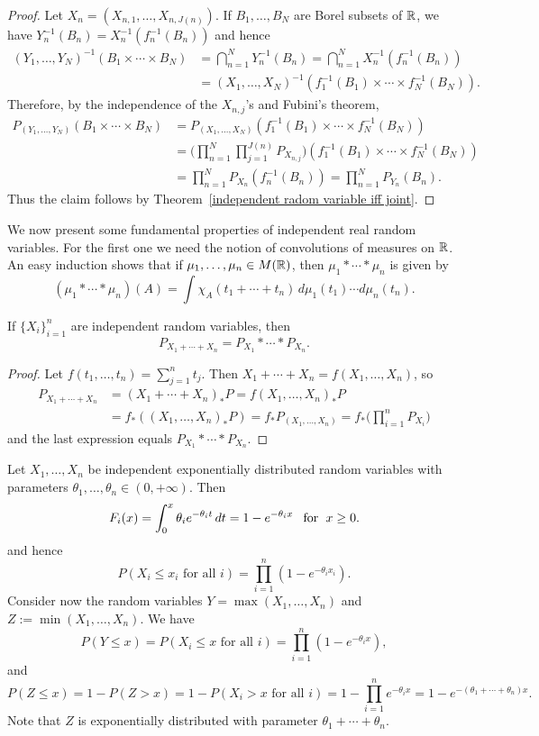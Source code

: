 \begin{proof}
Let $X_n=(X_{n,1},\dots,X_{n,J(n)})$. If $B_1,\dots,B_N$ are Borel subsets of $\mathbb{R}$, we have $Y_n^{-1}(B_n)=X_n^{-1}(f_n^{-1}(B_n))$ and hence
\begin{align*}
(Y_1,\dots,Y_N)^{-1}(B_1\times\cdots\times B_N)&=\bigcap_{n=1}^{N}Y_n^{-1}(B_n)=\bigcap_{n=1}^{N}X_n^{-1}(f_n^{-1}(B_n))\\
&=(X_1,\dots,X_N)^{-1}(f_1^{-1}(B_1)\times\cdots\times f_N^{-1}(B_N)).
\end{align*}
Therefore, by the independence of the $X_{n,j}$'s and Fubini's theorem,
\begin{align*}
P_{(Y_1,\dots,Y_N)}(B_1\times\cdots\times B_N)&=P_{(X_1,\dots,X_N)}(f_1^{-1}(B_1)\times\cdots\times f_N^{-1}(B_N))\\
&=\Big(\prod_{n=1}^{N}\prod_{j=1}^{J(n)}P_{X_{n,j}}\Big)(f_1^{-1}(B_1)\times\cdots\times f_N^{-1}(B_N))\\
&=\prod_{n=1}^{N}P_{X_n}(f_n^{-1}(B_n))=\prod_{n=1}^{N}P_{Y_n}(B_n).
\end{align*}
Thus the claim follows by Theorem~\ref{independent radom variable iff joint}.
\end{proof}
We now present some fundamental properties of independent real random variables. For the first one we need the notion of convolutions of measures on $\mathbb{R}$. An easy induction shows that if $\mu_1,\dots,\mu_n\in M(\mathbb{R})$, then $\mu_1\ast\cdots\ast\mu_n$ is given by
\[(\mu_1\ast\cdots\ast\mu_n)(A)=\int\chi_A(t_1+\cdots+t_n)\,d\mu_1(t_1)\cdots d\mu_n(t_n).\]
\begin{proposition}
If $\{X_i\}_{i=1}^{n}$ are independent random variables, then
\[P_{X_1+\cdots+X_n}=P_{X_1}\ast\cdots\ast P_{X_n}.\]
\end{proposition}
\begin{proof}
Let $f(t_1,\dots,t_n)=\sum_{j=1}^{n}t_j$. Then $X_1+\cdots+X_n=f(X_1,\dots,X_n)$, so
\begin{align*}
P_{X_1+\cdots+X_n}&=(X_1+\cdots+X_n)_*P=f(X_1,\dots,X_n)_*P\\
&=f_*((X_1,\dots,X_n)_*P)=f_*P_{(X_1,\dots,X_n)}=f_*\Big(\prod_{i=1}^{n}P_{X_i}\Big)
\end{align*}
and the last expression equals $P_{X_1}\ast\cdots\ast P_{X_n}$.
\end{proof}
\begin{example}
Let $X_1,\dots,X_n$ be independent exponentially distributed random variables with parameters $\theta_1,\dots,\theta_n\in(0,+\infty)$. Then
\[F_i(x)=\int_{0}^{x}\theta_ie^{-\theta_it}\,dt=1-e^{-\theta_i x}\hspace{8pt}\text{for}\hspace{6pt} x\geq 0.\]
and hence
\[P(X_i\leq x_i\text{ for all $i$})=\prod_{i=1}^{n}(1-e^{-\theta_i x_i}).\]
Consider now the random variables $Y=\max(X_1,\dots,X_n)$ and $Z:=\min(X_1,\dots,X_n)$. We have
\[P(Y\leq x)=P(X_i\leq x\text{ for all $i$})=\prod_{i=1}^{n}(1-e^{-\theta_ix}),\]
and
\[P(Z\leq x)=1-P(Z>x)=1-P(X_i>x\text{ for all $i$})=1-\prod_{i=1}^{n}e^{-\theta_i x}=1-e^{-(\theta_1+\cdots+\theta_n)x}.\]
Note that $Z$ is exponentially distributed with parameter $\theta_1+\cdots+\theta_n$.
\end{example}
